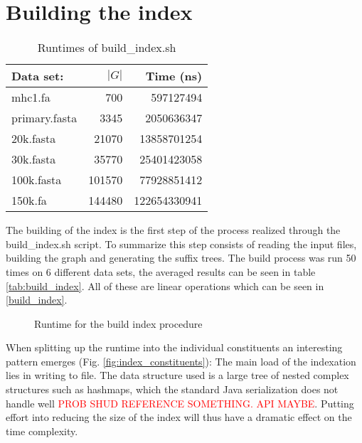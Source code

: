 \documentclass[thesis.tex]{subfiles}
\begin{document}
\section{Building the index}
\begin{wraptable}{r}{0.5\textwidth}
  \begin{tabular}{|l|r|r|}
    \hline \textbf{Data set:} & \textbf{$|G|$} & \textbf{Time (ns)}\\ \hline
    mhc1.fa & 700 & 597127494\\ \hline
    primary.fasta & 3345 & 2050636347\\ \hline
    20k.fasta & 21070 & 13858701254\\ \hline
    30k.fasta & 35770 & 25401423058\\ \hline
    100k.fasta & 101570 & 77928851412\\ \hline
    150k.fa & 144480 & 122654330941\\ \hline
  \end{tabular}
  \caption{Runtimes of build\_index.sh}
\end{wraptable}
The building of the index is the first step of the process realized through the build\_index.sh script. To summarize this step consists of reading the input files, building the graph and generating the suffix trees. The build process was run 50 times on 6 different data sets, the averaged results can be seen in table \ref{tab:build_index}. All of these are linear operations which can be seen in \ref{build_index}.\\
\begin{figure}[!b]
    \caption{Runtime for the build index procedure}
    \label{fig:build_index}
\end{figure}
\noindent
When splitting up the runtime into the individual constituents an interesting pattern emerges (Fig. \ref{fig:index_constituents}): The main load of the indexation lies in writing to file. The data structure used is a large tree of nested complex structures such as hashmaps, which the standard Java serialization does not handle well \textcolor{red}{PROB SHUD REFERENCE SOMETHING. API MAYBE}. Putting effort into reducing the size of the index will thus have a dramatic effect on the time complexity.
\end{document}

